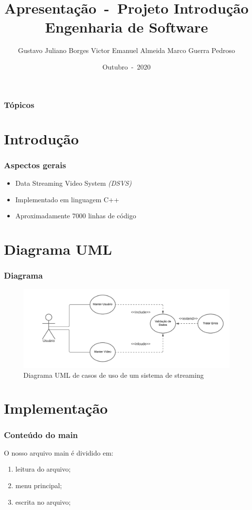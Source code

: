 \documentclass{beamer}
\author{Gustavo Juliano Borges \linebreak Victor Emanuel Almeida \linebreak Marco Guerra Pedroso}
\title{Apresentação~-~Projeto Introdução Engenharia de Software}
\date{Outubro~-~2020}
\begin{document}
	\frame{\titlepage}

	\begin{frame}
		\frametitle{Tópicos}
		\tableofcontents
	\end{frame}

	\section{Introdução}
	\begin{frame}
		\frametitle{Aspectos gerais}
		\begin{itemize}
			\item Data Streaming Video System \textit{(DSVS)} \linebreak
			
			\item Implementado em linguagem C++ \linebreak
			
			\item Aproximadamente 7000 linhas de código \linebreak
		\end{itemize}
	\end{frame}

	\section{Diagrama UML}
	\begin{frame}
		\frametitle{Diagrama}
		\begin{figure}[!htb]
			\centering
			\includegraphics[scale=.5]{images/DiagramaUML.png}
			\caption{\label{fig:}Diagrama UML de casos de uso de um sistema de streaming}
		\end{figure}
	\end{frame}

	\section{Implementação}
	\begin{frame}
		\frametitle{Conteúdo do main}
		O nosso arquivo main é dividido em:
		\begin{enumerate}
			\item leitura do arquivo;
			\item menu principal;
			\item escrita no arquivo;
		\end{enumerate}
	\end{frame}
\end{document}
